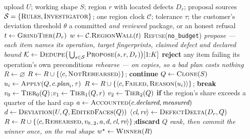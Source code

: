 \documentclass[10pt,onecolumn]{article}
\newcommand{\code}[1]{\texttt{\small #1}}
\begin{document}
\begin{algorithm}[H]
\caption{Tournament repair of one region: rehearse on clones, commit once, review last.}
\label{alg:tournament}
\footnotesize
\begin{algorithmic}[1]
\Require upload $U$; working shape $S$; region $r$ with located defects $D_r$; proposal sources
  $\mathcal{S} = \{\textsc{Rules},\textsc{Investigator}\}$; one region clock $\mathcal{C}$;
  tolerance $\tau$; the customer's deviation threshold $\theta$
\Ensure a committed \emph{and reviewed} package, or an honest refusal
\State $t \gets \textsc{GrindTier}(D_r)$ 
\State $w \gets \mathcal{C}.\textsc{RegionWall}(t)$
 \Return \textsc{Refuse}(\code{no\_budget}) 
\EndIf
\Statex \textit{propose --- each item names its operation, target fingerprints, claimed defect and declared bound}
\State $\mathcal{K} \gets \textsc{Dedupe}\big(\textstyle\bigcup_{s \in \mathcal{S}} \textsc{Propose}(s, r, D_r)\big)[1{:}K]$
\State \textbf{reject} any item failing its operation's own preconditions 
\Statex \textit{rehearse --- on copies, so a bad plan costs nothing}
\State $R \gets \varnothing$
    \State $R \gets R \cup \{\langle c, \textsc{NotRehearsed}\rangle\}$; \textbf{continue}
  \EndIf
  \State $Q \gets \textsc{Clone}(S)$ 
    \State $u_i \gets \textsc{Apply}(Q, c.\textit{plan}_i, \tau)$
      \State $R \gets R \cup \{\langle c, \textsc{Failed}, \textsc{Reason}(u_i)\rangle\}$; \textbf{break}
    \EndIf
  \EndFor
  \State $v_0 \gets \textsc{Tier}_0(Q)$;\quad $v_1 \gets \textsc{Tier}_1(Q, r)$
  \State $v_2 \gets \textsc{Tier}_2(Q)$ \textbf{if} the region's share exceeds a quarter of the hard cap
  \State $a \gets \textsc{Accounted}(c.\textit{declared}, \textit{measured})$ 
  \State $d \gets \textsc{Deviation}(U, Q, \textsc{EditedFaces}(Q))$ 
  \State $\langle \textit{cl}, \textit{rv} \rangle \gets \textsc{DefectDelta}(D_r, Q)$ 
  \State $R \gets R \cup \{\langle c, \textsc{Rehearsed}, v_{0..2}, a, d, \textit{cl}, \textit{rv}\rangle\}$;\quad \textbf{discard} $Q$
\EndFor
\Statex \textit{rank, then commit the winner \emph{once}, on the real shape}
\State $w^\star \gets \textsc{Winner}(R)$ 

\end{algorithmic}
\end{algorithm}
\end{document}
